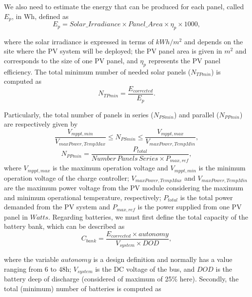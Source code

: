 \documentclass[review]{elsarticle}
\begin{document}
We also need to estimate the energy that can be produced for each panel, called $E_{p}$, in Wh, defined as
%
\begin{equation}
\label{eq:Ep}
E_{p} = Solar\_Irradiance \times Panel\_Area \times \eta_{p} \times 1000,
\end{equation}

\noindent where the solar irradiance is expressed in terms of $kWh/m^{2}$ and depends on the site where the PV system will be deployed; 
the PV panel area is given in $m^{2}$ and corresponds to the size of one PV panel, and $\eta_{p}$ represents the PV panel efficiency.
The total minimum number of needed solar panels ($N_{TPmin}$) is computed as
%
\begin{equation}
\label{eq:NTPmin}
N_{TPmin} = \dfrac{E_{corrected}}{E_{p}}.
\end{equation}

Particularly, the total number of panels in series ($N_{PSmin}$) and parallel ($N_{PPmin}$) are respectively given by
%
\begin{equation}
\label{eq:NPSmin}
\dfrac{V_{mppt,min}}{V_{maxPower,TempMax}} \leq N_{PSmin} \leq \dfrac{V_{mppt,max}}{V_{maxPower,TempMin}},
\end{equation}
%
\begin{equation}
\label{eq:NPPmin}
N_{PPmin} = \dfrac{P_{total}}{Number\,Panels\,Series \times P_{max,ref}},
\end{equation}
%
\noindent where $V_{mppt,max}$ is the maximum operation voltage and $V_{mppt,min}$ 
is the minimum operation voltage of the charge controller; $V_{maxPower,TempMax}$ and 
$V_{maxPower,TempMin}$ are the maximum power voltage from the PV module considering 
the maximum and minimum operational temperature, respectively; 
$P_{total}$ is the total power demanded from the PV system and 
$P_{max,ref}$ is the power supplied from one PV panel in $Watts$.
Regarding batteries, we must first define the total capacity of the battery bank, which can be described as
%
\begin{equation}
\label{eq:Cbank}
C_{bank} = \dfrac{E_{corrected} \times autonomy}{V_{system} \times DOD},
\end{equation}

\noindent where the variable $autonomy$ is a design definition and normally has a value ranging from $6$ to $48$h; 
$ V_{system} $ is the DC voltage of the bus, and $ DOD $ is the battery deep of discharge (considered of maximum of 25\% here).
%
Secondly, the total (minimum) number of batteries is computed as 
\end{document}
